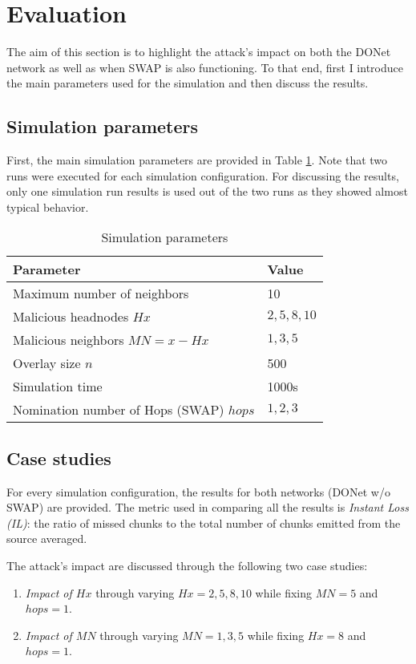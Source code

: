 \section{Evaluation}
\label{sec:eval}

The aim of this section is to highlight the attack's impact on both the DONet network as well as when SWAP is also functioning. 
To that end, first I introduce the main parameters used for the simulation and then discuss the results.

\subsection{Simulation parameters}
First, the main simulation parameters are provided in Table \ref{tab:SM-Parameters}. Note that two runs were executed for each simulation configuration. 
For discussing the results, only one simulation run results is used out of the two runs as they showed almost typical behavior.

\begin{table} [!htbp]
\centering
\caption{Simulation parameters}
\begin{tabular}{|l|l|}
\hline
\bf{Parameter} & \bf{Value} \\\hline\hline
Maximum number of neighbors & 10\\
\hline
Malicious headnodes $Hx$ & ${2,5,8,10}$ \\
 \hline
Malicious neighbors $MN=x-Hx$ & ${1,3,5}$ \\
 \hline
 Overlay size $n$ & 500 \\
 \hline
Simulation time & 1000s\\
\hline
Nomination number of Hops (SWAP) $hops$ & ${1,2,3}$\\
\hline
\end{tabular}

\label{tab:SM-Parameters}
 
\end{table}

\subsection{Case studies}
For every simulation configuration, the results for both networks (DONet w/o SWAP) are provided. 
The metric used in comparing all the results is \emph{Instant Loss (IL)}: the ratio of missed chunks to the total number of chunks emitted from the source averaged.

The attack's impact are discussed through the following two case studies:
\begin{enumerate}
 \item \emph{Impact of $Hx$} through varying $Hx={2,5,8,10}$ while fixing $MN=5$ and $hops=1$.
 \item \emph{Impact of $MN$} through varying $MN={1,3,5}$ while fixing $Hx=8$ and $hops=1$.
 
\end{enumerate}


